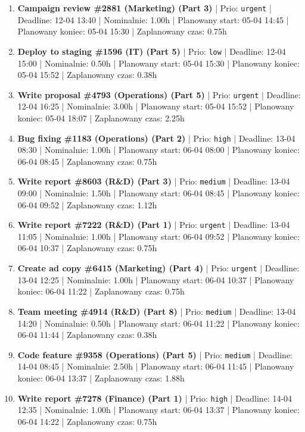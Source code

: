 {\begin{enumerate}
  \item [\textbf{14599}] \textbf{Campaign review \#2881 (Marketing) (Part 3)} | Prio: \texttt{urgent} | Deadline: 12-04 13:40 | Nominalnie: 1.00h | Planowany start: 05-04 14:45 | Planowany koniec: 05-04 15:30 | Zaplanowany czas: 0.75h
  \item [\textbf{14692}] \textbf{Deploy to staging \#1596 (IT) (Part 5)} | Prio: \texttt{low} | Deadline: 12-04 15:00 | Nominalnie: 0.50h | Planowany start: 05-04 15:30 | Planowany koniec: 05-04 15:52 | Zaplanowany czas: 0.38h
  \item [\textbf{14600}] \textbf{Write proposal \#4793 (Operations) (Part 5)} | Prio: \texttt{urgent} | Deadline: 12-04 16:25 | Nominalnie: 3.00h | Planowany start: 05-04 15:52 | Planowany koniec: 05-04 18:07 | Zaplanowany czas: 2.25h
  \item [\textbf{14613}] \textbf{Bug fixing \#1183 (Operations) (Part 2)} | Prio: \texttt{high} | Deadline: 13-04 08:30 | Nominalnie: 1.00h | Planowany start: 06-04 08:00 | Planowany koniec: 06-04 08:45 | Zaplanowany czas: 0.75h
  \item [\textbf{14634}] \textbf{Write report \#8603 (R\&D) (Part 3)} | Prio: \texttt{medium} | Deadline: 13-04 09:00 | Nominalnie: 1.50h | Planowany start: 06-04 08:45 | Planowany koniec: 06-04 09:52 | Zaplanowany czas: 1.12h
  \item [\textbf{14601}] \textbf{Write report \#7222 (R\&D) (Part 1)} | Prio: \texttt{urgent} | Deadline: 13-04 11:05 | Nominalnie: 1.00h | Planowany start: 06-04 09:52 | Planowany koniec: 06-04 10:37 | Zaplanowany czas: 0.75h
  \item [\textbf{14602}] \textbf{Create ad copy \#6415 (Marketing) (Part 4)} | Prio: \texttt{urgent} | Deadline: 13-04 12:25 | Nominalnie: 1.00h | Planowany start: 06-04 10:37 | Planowany koniec: 06-04 11:22 | Zaplanowany czas: 0.75h
  \item [\textbf{14638}] \textbf{Team meeting \#4914 (R\&D) (Part 8)} | Prio: \texttt{medium} | Deadline: 13-04 14:20 | Nominalnie: 0.50h | Planowany start: 06-04 11:22 | Planowany koniec: 06-04 11:44 | Zaplanowany czas: 0.38h
  \item [\textbf{14661}] \textbf{Code feature \#9358 (Operations) (Part 5)} | Prio: \texttt{medium} | Deadline: 14-04 08:45 | Nominalnie: 2.50h | Planowany start: 06-04 11:45 | Planowany koniec: 06-04 13:37 | Zaplanowany czas: 1.88h
  \item [\textbf{14609}] \textbf{Write report \#7278 (Finance) (Part 1)} | Prio: \texttt{high} | Deadline: 14-04 12:35 | Nominalnie: 1.00h | Planowany start: 06-04 13:37 | Planowany koniec: 06-04 14:22 | Zaplanowany czas: 0.75h

\end{enumerate}}
